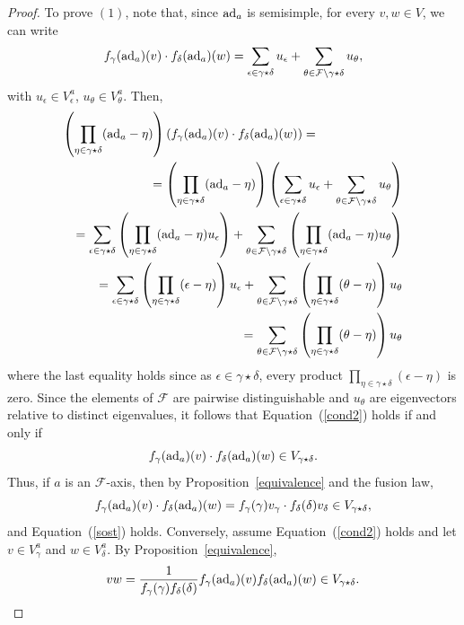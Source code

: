 \documentclass[a4paper]{amsart}
\newcommand{\ad}{{\rm ad}}
\begin{document}
\begin{proof}
To prove $(1)$, note that, since $\ad_a$ is semisimple, for every $v,w\in V$, we can write
\begin{equation}\label{sost}
f_\gamma(\ad_a)( v) \cdot f_\delta(\ad_a) (w)=\sum_{\epsilon \in \gamma\star\delta}u_\epsilon+\sum_{\theta \in \mathcal F\setminus \gamma\star\delta}u_\theta,
\end{equation}
 with $u_\epsilon \in V_\epsilon^a$, $u_\theta \in V_\theta^a$. 
Then, 
\begin{eqnarray}\label{autovettori}
\lefteqn{\left (\prod_{\eta \in \gamma\star \delta}(\ad_a-\eta )\right )\left (f_\gamma(\ad_a)( v) \cdot f_\delta(\ad_a) (w)\right )=} \\
&& =\left (\prod_{\eta \in \gamma\star \delta}(\ad_a-\eta )\right )\left (\sum_{\epsilon \in \gamma\star\delta}u_\epsilon+\sum_{\theta \in \mathcal F\setminus \gamma\star\delta}u_\theta\right ) \nonumber\\
&&=\sum_{\epsilon \in \gamma\star\delta}\left (\prod_{\eta \in \gamma\star \delta}(\ad_a-\eta )u_\epsilon\right )+\sum_{\theta  \in \mathcal F\setminus \gamma\star\delta}\left (\prod_{\eta \in \gamma\star \delta}(\ad_a-\eta )u_\theta\right )\nonumber\\
&&=\sum_{\epsilon  \in \gamma\star\delta}\left (\prod_{\eta \in \gamma\star \delta}(\epsilon-\eta )\right )u_\epsilon +\sum_{\theta  \in \mathcal F\setminus \gamma\star\delta}\left (\prod_{\eta \in \gamma\star \delta}(\theta-\eta )\right )u_\theta  \nonumber \\
&&=\sum_{\theta  \in \mathcal F\setminus \gamma\star\delta}\left (\prod_{\eta \in \gamma\star \delta}(\theta-\eta )\right )u_\theta  \nonumber
\end{eqnarray}
where the last equality holds since as $\epsilon \in \gamma\star \delta$, every product $\prod_{\eta \in \gamma\star \delta}(\epsilon-\eta )$ is zero. Since the elements of $\mathcal F$ are pairwise distinguishable and $u_\theta$ are eigenvectors relative to distinct eigenvalues, it follows that Equation~(\ref{cond2}) holds if and only if 
$$f_\gamma(\ad_a)( v) \cdot f_\delta(\ad_a) (w)\in V_{\gamma \star \delta}.
$$ 
Thus, if $a$ is an $\mathcal F$-axis, then by Proposition~\ref{equivalence} and the fusion law, 
$$
f_\gamma(\ad_a)( v) \cdot f_\delta(\ad_a) (w)=f_\gamma(\gamma)v_\gamma\cdot  f_\delta(\delta)v_\delta\in V_{\gamma \star \delta},$$
and Equation~(\ref{sost}) holds. Conversely, assume Equation~(\ref{cond2}) holds and   let $v\in V_\gamma^a$ and $w\in V_\delta^a$. By Proposition~\ref{equivalence}, 
$$vw=\frac{1}{f_\gamma(\gamma)f_\delta(\delta)}f_\gamma(\ad_a)(v)f_\delta(\ad_a)(w)\in V_{\gamma \star \delta}.$$


\end{proof}
\end{document}
